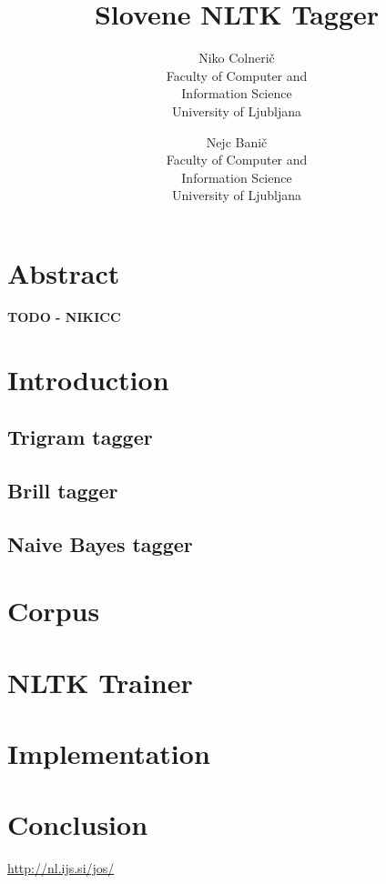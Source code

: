 \documentclass[11pt,a4paper,english,twocolumn]{article}
\title{\textbf{Slovene NLTK Tagger}}
\author{
Niko Colnerič \\
\footnotesize Faculty of Computer and \\
\footnotesize Information Science \\
\footnotesize University of Ljubljana \\
\and
Nejc Banič \\
\footnotesize Faculty of Computer and \\
\footnotesize Information Science \\
\footnotesize University of Ljubljana \\
}
\begin{document}
\maketitle
\thispagestyle{empty}

\section*{Abstract}
\textbf{TODO - NIKICC}

\section{Introduction}
\subsection{Trigram tagger}
\subsection{Brill tagger}
\subsection{Naive Bayes tagger}
\section{Corpus}
\section{NLTK Trainer}
\section{Implementation}
\section{Conclusion}

\blinddocument

\begin{thebibliography}{99}
 \url{http://nl.ijs.si/jos/}

\end{thebibliography}
\end{document}
